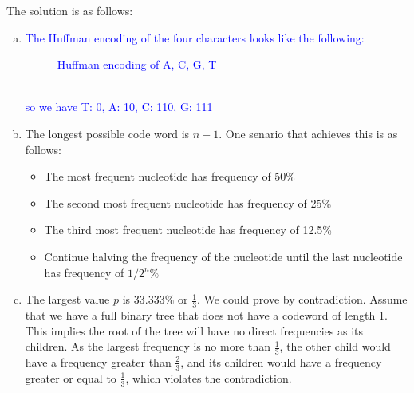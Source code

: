 \documentclass[10pt]{article}
\begin{document}
\begin{solution}
    The solution is as follows:
    \begin{enumerate}[(a)]
        \item \textcolor{blue}{The Huffman encoding of the four characters looks like the following:
        \begin{figure}[ht]
            \centering
                \caption{Huffman encoding of A, C, G, T}
        \end{figure}
        \\so we have T: 0, A: 10, C: 110, G: 111}
        \item The longest possible code word is $n-1$. One senario that achieves this is as follows:
        \begin{itemize}
            \item The most frequent nucleotide has frequency of 50\%
            \item The second most frequent nucleotide has frequency of 25\%
            \item The third most frequent nucleotide has frequency of 12.5\%
            \item Continue halving the frequency of the nucleotide until the last nucleotide has frequency of $1/2^n\%$
        \end{itemize}
        \item The largest value $p$ is $33.333\%$ or $\frac{1}{3}$. We could prove by contradiction. Assume that we have a full binary tree that does not have a codeword of length 1. This implies the root of the tree will have no direct frequencies as its children.
        As the largest frequency is no more than $\frac{1}{3}$, the other child would have a frequency greater than $\frac{2}{3}$, and its children would have a frequency greater or equal to $\frac{1}{3}$, which violates the contradiction. 
    \end{enumerate}
\end{solution}
\end{document}
